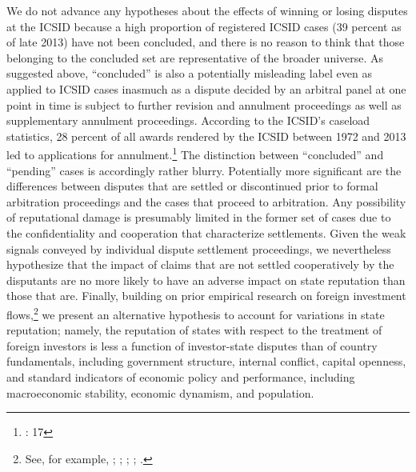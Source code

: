 \documentclass[12pt,onesided]{amsart}
\begin{document}
We do not advance any hypotheses about the effects of winning or losing disputes at the ICSID because a high proportion of registered ICSID cases (39 percent as of late 2013) have not been concluded, and there is no reason to think that those belonging to the concluded set are representative of the broader universe. As suggested above, ``concluded'' is also a potentially misleading label even as applied to ICSID cases inasmuch as a dispute decided by an arbitral panel at one point in time is subject to further revision and annulment proceedings as well as supplementary annulment proceedings. According to the ICSID's caseload statistics, 28 percent of all awards rendered by the ICSID between 1972 and 2013 led to applications for annulment.\footnote{\citet{icsid:2014}: 17} The distinction between ``concluded'' and ``pending'' cases is accordingly rather blurry. Potentially more significant are the differences between disputes that are settled or discontinued prior to formal arbitration proceedings and the cases that proceed to arbitration. Any possibility of reputational damage is presumably limited in the former set of cases due to the confidentiality and cooperation that characterize settlements. Given the weak signals conveyed by individual dispute settlement proceedings, we nevertheless hypothesize that the impact of claims that are not settled cooperatively by the disputants are no more likely to have an adverse impact on state reputation than those that are. Finally, building on prior empirical research on foreign investment flows,\footnote{See, for example, \citet{salacuse:2005}; \citet{buthe:milner:2009}; \citet{neumayer:spess:2005}; \citet{birch:gallagher:2006}; \citet{yackee:2008}.} we present an alternative hypothesis to account for variations in state reputation; namely, the reputation of states with respect to the treatment of foreign investors is less a function of investor-state disputes than of country fundamentals, including  government structure, internal conflict, capital openness, and standard indicators of economic policy and performance, including macroeconomic stability, economic dynamism, and population.
\end{document}

